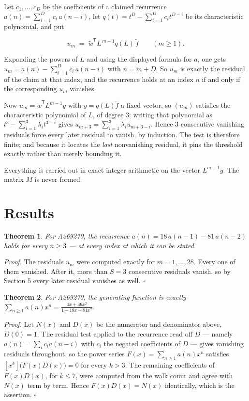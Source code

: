 \documentclass[11pt]{article}
\newtheorem{theorem}{Theorem}
\theoremstyle{definition}
\begin{document}
Let $c_1,\dots,c_D$ be the coefficients of a claimed recurrence $a(n) = \sum_{i=1}^{D} c_i\,a(n-i)$, let $q(t) = t^{D} - \sum_{i=1}^{D} c_i t^{D-i}$ be its characteristic polynomial, and put

\[u_m \;=\; \tilde w^{\mathsf T} L^{\,m-1} q(L)\,\tilde f \qquad (m \ge 1).\]

Expanding the powers of $L$ and using the displayed formula for $a$, one gets $u_m = a(n) - \sum_{i=1}^{D} c_i\,a(n-i)$ with $n = m + D$. So $u_m$ is exactly the residual of the claim at that index, and the recurrence holds at an index $n$ if and only if the corresponding $u_m$ vanishes.

Now $u_m = \tilde w^{\mathsf T} L^{m-1} y$ with $y = q(L)\tilde f$ a fixed vector, so $(u_m)$ satisfies the characteristic polynomial of $L$, of degree $3$: writing that polynomial as $t^{3} - \sum_{i=1}^{3} \lambda_i t^{3-i}$ gives $u_{m+3} = \sum_{i=1}^{3} \lambda_i u_{m+3-i}$. Hence $3$ consecutive vanishing residuals force every later residual to vanish, by induction. The test is therefore finite; and because it locates the {\itshape last} nonvanishing residual, it pins the threshold exactly rather than merely bounding it.

Everything is carried out in exact integer arithmetic on the vector $L^{m-1}y$. The matrix $M$ is never formed.

\section{Results}

\begin{theorem} For A269270, the recurrence $a(n) = 18\,a(n-1) - 81\,a(n-2)$ holds for every $n \ge 3$ --- at every index at which it can be stated.\end{theorem}

{\itshape Proof.} The residuals $u_m$ were computed exactly for $m = 1,\dots,28$. Every one of them vanished. After it, more than $S = 3$ consecutive residuals vanish, so by Section 5 every later residual vanishes as well. $\square$

\begin{theorem} For A269270, the generating function is exactly $\sum_{n\ge 1} a(n)x^n = \frac{4x + 36x^{2}}{1 - 18x + 81x^{2}}$.\end{theorem}

{\itshape Proof.} Let $N(x)$ and $D(x)$ be the numerator and denominator above, $D(0)=1$. The residual test applied to the recurrence read off $D$ --- namely $a(n) = \sum_i c_i a(n-i)$ with $c_i$ the negated coefficients of $D$ --- gives vanishing residuals throughout, so the power series $F(x)=\sum_{n\ge 1}a(n)x^n$ satisfies $[x^k]\bigl(F(x)D(x)\bigr) = 0$ for every $k > 3$. The remaining coefficients of $F(x)D(x)$, for $k \le 7$, were computed from the walk count and agree with $N(x)$ term by term. Hence $F(x)D(x) = N(x)$ identically, which is the assertion. $\square$
\end{document}
